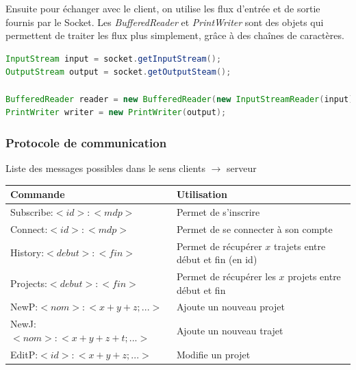 Ensuite pour échanger avec le client, on utilise les flux d'entrée et de sortie fournis par le Socket.
Les \emph{BufferedReader} et \emph{PrintWriter} sont des objets qui permettent de traiter les flux plus simplement, grâce à des chaînes de caractères.

\begin{lstlisting}[language=Java]
InputStream input = socket.getInputStream();
OutputStream output = socket.getOutputSteam();

BufferedReader reader = new BufferedReader(new InputStreamReader(input));
PrintWriter writer = new PrintWriter(output);
\end{lstlisting}

\subsubsection{Protocole de communication}
    \begin{center}
        Liste des messages possibles dans le sens clients $\rightarrow$ serveur
        \par
        \begin{tabular}{|l|l|}
            \hline
            Commande & Utilisation\\
            \hline
            Subscribe:$<id>:<mdp>$ & Permet de s'inscrire\\
            \hline
            Connect:$<id>:<mdp>$ & Permet de se connecter à son compte\\
            \hline
            \hline
            History:$<debut>:<fin>$ & Permet de récupérer $x$ trajets entre début et fin (en id)\\
            \hline
            Projects:$<debut>:<fin>$ & Permet de récupérer les $x$ projets entre début et fin\\
            \hline
            \hline
            NewP:$<nom>:<x+y+z;...>$ & Ajoute un nouveau projet\\
            \hline
            NewJ:$<nom>:<x+y+z+t;...>$ & Ajoute un nouveau trajet\\
            \hline
            EditP:$<id>:<x+y+z;...>$ & Modifie un projet\\
            \hline
        \end{tabular}
    \end{center}
